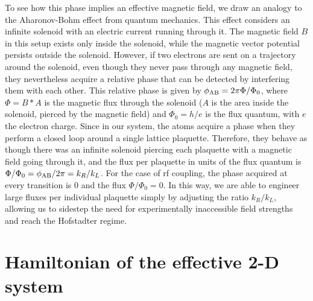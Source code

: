To see how this phase implies an effective magnetic field, we draw an analogy to the Aharonov-Bohm effect\cite{Aharonov1959, Aharonov1992} from quantum mechanics. This effect considers an infinite solenoid with an electric current running through it. The magnetic field $B$ in this setup exists only inside the solenoid, while the magnetic vector potential persists outside the solenoid.  However, if two electrons are sent on a trajectory around the solenoid, even though they never pass through any magnetic field, they nevertheless acquire a relative phase that can be detected by interfering them with each other. This relative phase is given by $\phi_{\rm AB} =2 \pi \Phi/\Phi_0$, where $\Phi = B*A$ is the magnetic flux through the solenoid ($A$ is the area inside the solenoid, pierced by the magnetic field) and $\Phi_0=h/e$ is the flux quantum, with $e$ the electron charge. Since in our system, the atoms acquire a phase when they perform a closed loop around a single lattice plaquette. Therefore, they behave as though there was an infinite solenoid piercing each plaquette with a magnetic field going through it, and the flux per plaquette in units of the flux quantum is $\Phi/\Phi_0=\phi_{\rm AB}/2\pi =  k_R/k_L$. For the case of rf coupling, the phase acquired at every transition is $0$ and the flux $\Phi/\Phi_0=0$. In this way, we are able to engineer large fluxes per individual plaquette simply by adjusting the ratio $k_R/k_L$, allowing us to sidestep the need for experimentally inaccessible field strengths and reach the Hofstadter regime. 

\section{Hamiltonian of the effective 2-D system}

